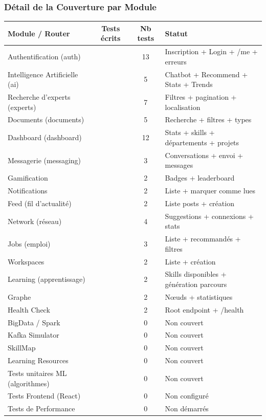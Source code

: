 \documentclass[12pt,a4paper]{article}
\newcommand{\cmark}{\textcolor{vert}{\ding{51}}}
\newcommand{\xmark}{\textcolor{rouge}{\ding{55}}}
\newcommand{\wmark}{\textcolor{orange}{\ding{115}}}
\begin{document}
\subsubsection{Détail de la Couverture par Module}

\begin{center}
\renewcommand{\arraystretch}{1.3}
\begin{tabular}{|l|c|c|l|}
\hline
\rowcolor{bleu!15}
\textbf{Module / Router} & \textbf{Tests écrits} & \textbf{Nb tests} & \textbf{Statut} \\
\hline
Authentification (auth) & \cmark & 13 & Inscription + Login + /me + erreurs \\
\hline
Intelligence Artificielle (ai) & \cmark & 5 & Chatbot + Recommend + Stats + Trends \\
\hline
Recherche d'experts (experts) & \cmark & 7 & Filtres + pagination + localisation \\
\hline
Documents (documents) & \cmark & 5 & Recherche + filtres + types \\
\hline
Dashboard (dashboard) & \cmark & 12 & Stats + skills + départements + projets \\
\hline
Messagerie (messaging) & \cmark & 3 & Conversations + envoi + messages \\
\hline
Gamification & \cmark & 2 & Badges + leaderboard \\
\hline
Notifications & \cmark & 2 & Liste + marquer comme lues \\
\hline
Feed (fil d'actualité) & \cmark & 2 & Liste posts + création \\
\hline
Network (réseau) & \cmark & 4 & Suggestions + connexions + stats \\
\hline
Jobs (emploi) & \cmark & 3 & Liste + recommandés + filtres \\
\hline
Workspaces & \cmark & 2 & Liste + création \\
\hline
Learning (apprentissage) & \cmark & 2 & Skills disponibles + génération parcours \\
\hline
Graphe & \cmark & 2 & Nœuds + statistiques \\
\hline
Health Check & \cmark & 2 & Root endpoint + /health \\
\hline
\rowcolor{orangeclair}
BigData / Spark & \wmark & 0 & Non couvert \\
\hline
\rowcolor{orangeclair}
Kafka Simulator & \wmark & 0 & Non couvert \\
\hline
\rowcolor{orangeclair}
SkillMap & \wmark & 0 & Non couvert \\
\hline
\rowcolor{orangeclair}
Learning Resources & \wmark & 0 & Non couvert \\
\hline
\rowcolor{rougeclair}
Tests unitaires ML (algorithmes) & \xmark & 0 & Non couvert \\
\hline
\rowcolor{rougeclair}
Tests Frontend (React) & \xmark & 0 & Non configuré \\
\hline
\rowcolor{rougeclair}
Tests de Performance & \xmark & 0 & Non démarrés \\
\hline
\end{tabular}
\end{center}
\end{document}
